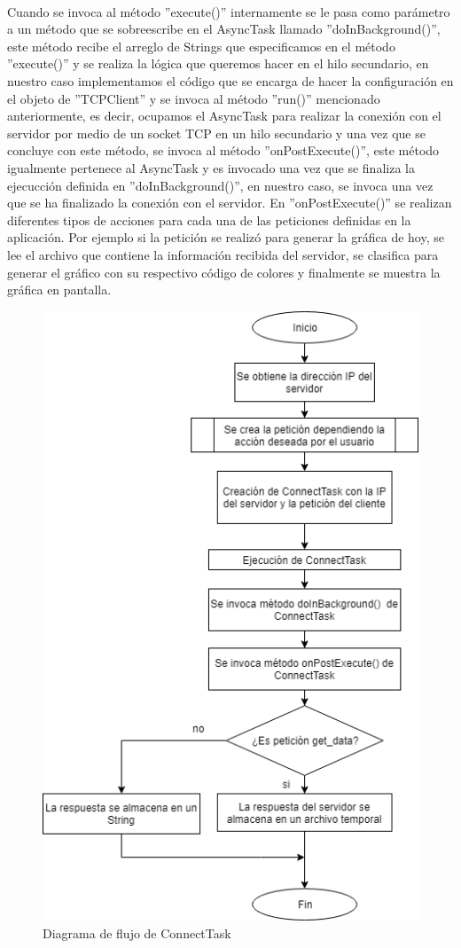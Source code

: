 \\ \newline
Cuando se invoca al método ''execute()'' internamente se le pasa como parámetro a un método que se sobreescribe en el AsyncTask llamado ''doInBackground()'', este método recibe el arreglo de Strings que especificamos en el método ''execute()'' y se realiza la lógica que queremos hacer en el hilo secundario, en nuestro caso implementamos el código que se encarga de hacer la configuración en el objeto de ''TCPClient'' y se invoca al método ''run()'' mencionado anteriormente, es decir, ocupamos el AsyncTask para realizar la conexión con el servidor por medio de un socket TCP en un hilo secundario y una vez que se concluye con este método, se invoca al método ''onPostExecute()'', este método igualmente pertenece al AsyncTask y es invocado una vez que se finaliza la ejecucción definida en ''doInBackground()'', en nuestro caso, se invoca una vez que se ha finalizado la conexión con el servidor. En ''onPostExecute()'' se realizan diferentes tipos de acciones para cada una de las peticiones definidas en la aplicación. Por ejemplo si la petición se realizó para generar la gráfica de hoy, se lee el archivo que contiene la información recibida del servidor, se clasifica para generar el gráfico con su respectivo código de colores y finalmente se muestra la gráfica en pantalla.

\begin{figure}[H]
	\centering
	\includegraphics[scale=.6]{Capitulo5/images/df_connecttask.png}
	\caption{Diagrama de flujo de ConnectTask}
	\label{fig:Diagrama de flujo de ConnectTask}
\end{figure} 

